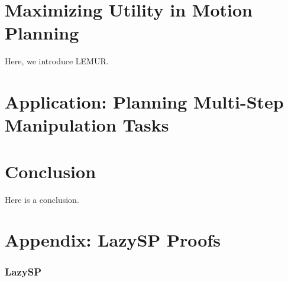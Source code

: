 \documentclass[nobib]{tufte-book}
\begin{document}
{\begin{algorithm}[t]
\begin{minipage}[t]{8.2cm}
   \end{minipage}
\end{algorithm}
} %


\chapter{Maximizing Utility in Motion Planning}
\label{chap:lemur}

Here, we introduce LEMUR.


\chapter{Application: Planning Multi-Step Manipulation Tasks}
\label{chap:family}


\chapter{Conclusion}

Here is a conclusion.


\appendix

\chapter{Appendix: LazySP Proofs}
\label{sec:appendix-proofs}

\subsection{LazySP}
\end{document}

